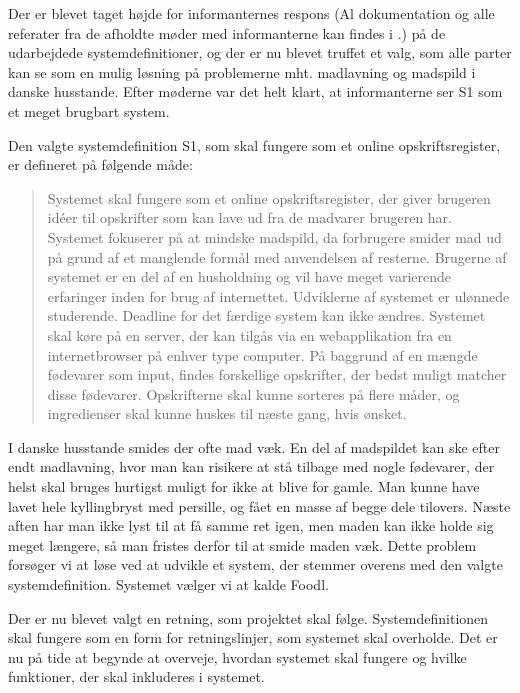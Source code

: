 Der er blevet taget højde for informanternes respons (Al dokumentation og alle referater fra de afholdte møder med informanterne kan findes i .) på de udarbejdede systemdefinitioner, og der er nu blevet truffet et valg, som alle parter kan se som en mulig løsning på problemerne mht. madlavning og madspild i danske husstande. Efter møderne var det helt klart, at informanterne ser S1 som et meget brugbart system. 

Den valgte systemdefinition S1, som skal fungere som et online opskriftsregister, er defineret på følgende måde:

\begin{quote}
Systemet skal fungere som et online opskriftsregister, der giver brugeren idéer til opskrifter som kan lave ud fra de madvarer brugeren har. Systemet fokuserer på at mindske madspild, da forbrugere smider mad ud på grund af et manglende formål med anvendelsen af resterne. Brugerne af systemet er en del af en husholdning og vil have meget varierende erfaringer inden for brug af internettet. Udviklerne af systemet er ulønnede studerende. Deadline for det færdige system kan ikke ændres. Systemet skal køre på en server, der kan tilgås via en webapplikation fra en internetbrowser på enhver type computer. På baggrund af en mængde fødevarer som input, findes forskellige opskrifter, der bedst muligt matcher disse fødevarer. Opskrifterne skal kunne sorteres på flere måder, og ingredienser skal kunne huskes til næste gang, hvis ønsket.
\end{quote}

I danske husstande smides der ofte mad væk. En del af madspildet kan \fx ske efter endt madlavning, hvor man kan risikere at stå tilbage med nogle fødevarer, der helst skal bruges hurtigst muligt for ikke at blive for gamle. Man kunne \fx have lavet hele kyllingbryst med persille, og fået en masse af begge dele tilovers. Næste aften har man ikke lyst til at få samme ret igen, men maden kan ikke holde sig meget længere, så man fristes derfor til at smide maden væk. Dette problem forsøger vi at løse ved at udvikle et system, der stemmer overens med den valgte systemdefinition. Systemet vælger vi at kalde Foodl.

Der er nu blevet valgt en retning, som projektet skal følge. Systemdefinitionen skal fungere som en form for retningslinjer, som systemet skal overholde. Det er nu på tide at begynde at overveje, hvordan systemet skal fungere og hvilke funktioner, der skal inkluderes i systemet.